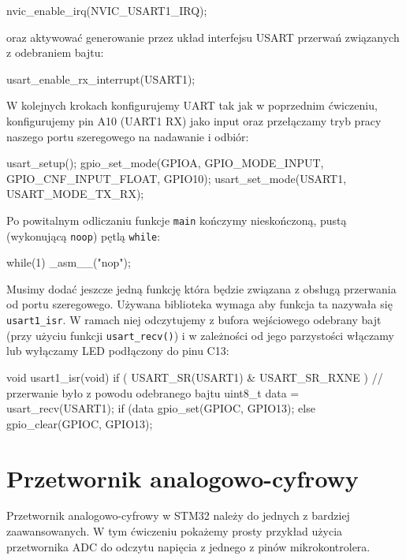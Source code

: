 \documentclass{pdfBooklets}
\begin{document}
\begin{CodeFrame*}[c]{}
  nvic_enable_irq(NVIC_USART1_IRQ);
\end{CodeFrame*}
oraz aktywować generowanie przez układ interfejsu USART przerwań związanych z odebraniem bajtu:

\begin{CodeFrame*}[c]{}
  usart_enable_rx_interrupt(USART1);
\end{CodeFrame*}

W kolejnych krokach konfigurujemy UART tak jak w poprzednim ćwiczeniu, konfigurujemy pin A10 (UART1 RX) jako input oraz przełączamy tryb pracy naszego portu szeregowego na nadawanie i odbiór:

\begin{CodeFrame*}[c]{}
  usart_setup();
  gpio_set_mode(GPIOA, GPIO_MODE_INPUT, GPIO_CNF_INPUT_FLOAT, GPIO10);
  usart_set_mode(USART1, USART_MODE_TX_RX);
\end{CodeFrame*}

Po powitalnym odliczaniu funkcje \Verb$main$ kończymy nieskończoną, pustą (wykonującą \Verb$noop$) pętlą \Verb$while$:

\begin{CodeFrame*}[c]{}
  while(1)
      _asm__("nop");
\end{CodeFrame*}

Musimy dodać jeszcze jedną funkcję która będzie związana z obsługą przerwania od portu szeregowego.
Używana biblioteka wymaga aby funkcja ta nazywała się \Verb#usart1_isr#.
W ramach niej odczytujemy z bufora wejściowego odebrany bajt (przy użyciu funkcji \Verb$usart_recv()$) i w zależności od jego parzystości włączamy lub wyłączamy LED podłączony do pinu C13:
\begin{CodeFrame*}[c]{}
  void usart1_isr(void) {
    if ( USART_SR(USART1) & USART_SR_RXNE ) { // przerwanie było z powodu odebranego bajtu
      uint8_t data = usart_recv(USART1);
      if (data%
        gpio_set(GPIOC, GPIO13);
      else
        gpio_clear(GPIOC, GPIO13);
    }
  }
\end{CodeFrame*}

\section{Przetwornik analogowo-cyfrowy}
Przetwornik analogowo-cyfrowy w STM32 należy do jednych z bardziej zaawansowanych. W tym ćwiczeniu pokażemy prosty przykład
użycia przetwornika ADC do odczytu napięcia z jednego z pinów mikrokontrolera.
\end{document}
